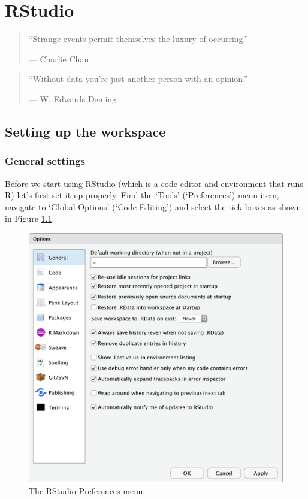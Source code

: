 \documentclass[
]{book}
\begin{document}
\hypertarget{rstudio}{%
\chapter{RStudio}\label{rstudio}}

\begin{quote}
``Strange events permit themselves the luxury of occurring.''

--- Charlie Chan
\end{quote}

\begin{quote}
``Without data you're just another person with an opinion.''

--- W. Edwards Deming
\end{quote}

\hypertarget{setting-up-the-workspace}{%
\section{Setting up the workspace}\label{setting-up-the-workspace}}

\hypertarget{general-settings}{%
\subsection{General settings}\label{general-settings}}

Before we start using RStudio (which is a code editor and environment that runs R) let's first set it up properly. Find the `Tools' (`Preferences') menu item, navigate to `Global Options' (`Code Editing') and select the tick boxes as shown in Figure \ref{fig:RStudio-prefs}.

\begin{figure}

{\centering \includegraphics[width=1\linewidth]{figures/RStudio_preferences} 

}

\caption{The RStudio Preferences menu.}\label{fig:RStudio-prefs}
\end{figure}
\end{document}
